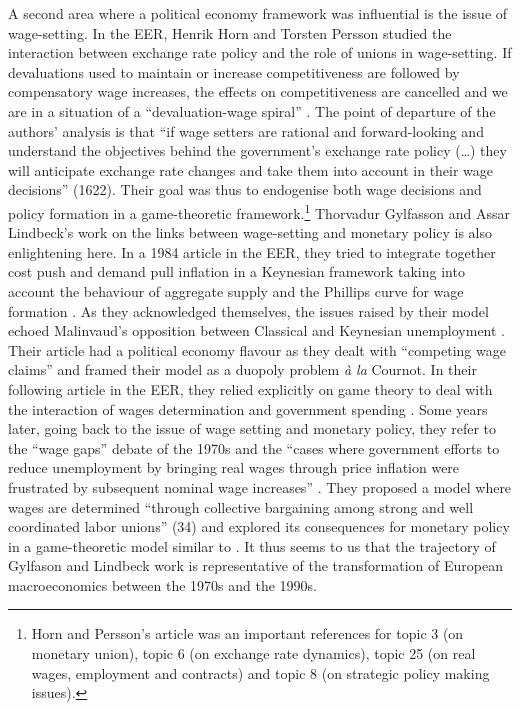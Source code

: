 \documentclass[]{elsarticle} %
\begin{document}
A second area where a political economy framework was influential is the
issue of wage-setting. In the EER, Henrik Horn and Torsten Persson
\citeyearpar{horn1988} studied the interaction between exchange rate
policy and the role of unions in wage-setting. If devaluations used to
maintain or increase competitiveness are followed by compensatory wage
increases, the effects on competitiveness are cancelled and we are in a
situation of a ``devaluation-wage spiral'' \citep[1621]{horn1988}. The
point of departure of the authors' analysis is that ``if wage setters
are rational and forward-looking and understand the objectives behind
the government's exchange rate policy (\ldots) they will anticipate
exchange rate changes and take them into account in their wage
decisions'' (1622). Their goal was thus to endogenise both wage
decisions and policy formation in a game-theoretic framework.\footnote{Horn
  and Persson's \citeyearpar{horn1988} article was an important
  references for topic 3 (on monetary union), topic 6 (on exchange rate
  dynamics), topic 25 (on real wages, employment and contracts) and
  topic 8 (on strategic policy making issues).} Thorvadur Gylfasson and
Assar Lindbeck's work on the links between wage-setting and monetary
policy is also enlightening here. In a 1984 article in the EER, they
tried to integrate together cost push and demand pull inflation in a
Keynesian framework taking into account the behaviour of aggregate
supply and the Phillips curve for wage formation \citep{gylfason1984}.
As they acknowledged themselves, the issues raised by their model echoed
Malinvaud's \citeyearpar{malinvaud1977} opposition between Classical and
Keynesian unemployment \citep[6-7]{gylfason1984}. Their article had a
political economy flavour as they dealt with ``competing wage claims''
and framed their model as a duopoly problem \emph{à la} Cournot. In
their following article in the EER, they relied explicitly on game
theory to deal with the interaction of wages determination and
government spending \citep{gylfason1986}. Some years later, going back
to the issue of wage setting and monetary policy, they refer to the
``wage gaps'' debate of the 1970s and the ``cases where government
efforts to reduce unemployment by bringing real wages through price
inflation were frustrated by subsequent nominal wage increases''
\citep[34]{gylfason1994}. They proposed a model where wages are
determined ``through collective bargaining among strong and well
coordinated labor unions'' (34) and explored its consequences for
monetary policy in a game-theoretic model similar to
\citep{barro1983, barro1983c}. It thus seems to us that the trajectory
of Gylfason and Lindbeck work is representative of the transformation of
European macroeconomics between the 1970s and the 1990s.
\end{document}

